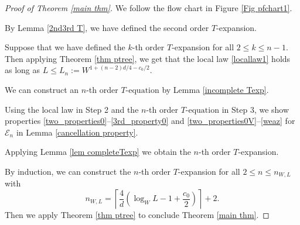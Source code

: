 \documentclass{article}
\newcommand{\1}{\mathds{1}}
\numberwithin{equation}{section}
\newcommand{\be}{\begin{equation}}
\newcommand{\ee}{\end{equation}}
\renewcommand{\leq}{\leqslant}
\renewcommand{\le}{\leq}
\theoremstyle{plain} %
\theoremstyle{remark}
\newcommand{\wtSdelta}{\Sigma}
\newcommand{\Sele}{{\mathcal E}}
\newcommand{\incomp}{{\text{$T$-equation}}}
\begin{document}
\begin{proof}[Proof of Theorem \ref{main thm}]
We follow the  flow chart in Figure \ref{Fig pfchart1}. %

\vspace{5pt}
 By Lemma \ref{2nd3rd T}, we have defined the second order $T$-expansion. 

\vspace{5pt}
 Suppose that we have defined the $k$-th order $T$-expansion for all $2\le k \le n-1$. Then applying Theorem \ref{thm ptree}, we get that the local law \eqref{locallaw1} holds as long as $L\le L_n:=W^{1+(n-2)d/{4} - {c_0}/{2}}$. %

\vspace{5pt}
We can construct an $n$-th order $\incomp$ by Lemma \ref{incomplete Texp}. 

\vspace{5pt}
 Using the local law in Step 2 and the $n$-th order $\incomp$ in Step 3, we show properties \eqref{two_properties0}--\eqref{3rd_property0} and \eqref{two_properties0V}--\eqref{weaz} for $\Sele_n$ in Lemma \ref{cancellation property}. 



\vspace{5pt}
Applying Lemma \ref{lem completeTexp} we obtain the $n$-th order $T$-expansion. 

\vspace{5pt}
By induction, we can construct the $n$-th order $T$-expansion for all $2\le n \le n_{W,L}$ with $$n_{W,L} = \left\lceil\frac{4}{d}\left(\log_W L  - 1 + \frac{c_0}{2}\right)\right\rceil+2.$$ 
Then we apply Theorem \ref{thm ptree} to  conclude Theorem \ref{main thm}. 
\end{proof}
\end{document}
